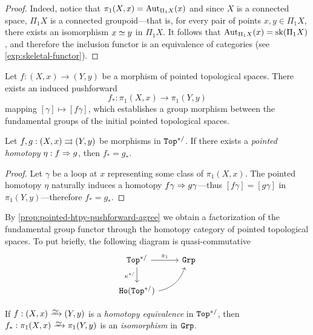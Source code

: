 \begin{proof}
    Indeed, notice that \(\pi_1(X, x) = \operatorname{Aut}_{\Pi_1 X}(x)\) and since \(X\) is a
    connected space, \(\Pi_1 X\) is a connected groupoid---that is, for every pair
    of points \(x, y \in \Pi_1 X\), there exists an isomorphism \(x \simeq y\) in
    \(\Pi_1 X\). It follows that \(\operatorname{Aut}_{\Pi_1 X} (x) = \operatorname{sk} (\Pi_1 X)\), and
    therefore the inclusion functor is an equivalence of categories (see
    \cref{exp:skeletal-functor}).
\end{proof}

\begin{definition}[Pushforwards in \(\pi_1\)]
    \label{def:pushforward-pi1}
    Let \(f: (X, x) \to (Y, y)\) be a morphism of pointed topological spaces. There
    exists an induced pushforward
    \[
        f_{*}: \pi_1(X, x) \longrightarrow \pi_1(Y, y)
    \]
    mapping \([\gamma] \mapsto [f \gamma]\), which establishes a group morphism
    between the fundamental groups of the initial pointed topological spaces.
\end{definition}

\begin{proposition}
    \label{prop:pointed-htpy-pushforward-agree}
    Let \(f, g: (X, x) \rightrightarrows (Y, y)\) be morphisms in \({\texttt{Top}^{*/}}\). If there exists a
    \emph{pointed homotopy} \(\eta: f \Rightarrow g\), then \(f_{*} = g_{*}\).
\end{proposition}

\begin{proof}
    Let \(\gamma\) be a loop at \(x\) representing some class of \(\pi_1(X,
    x)\). The pointed homotopy \(\eta\) naturally induces a homotopy
    \(f \gamma \Rightarrow g \gamma\)---thus \([f \gamma] = [g \gamma]\) in
    \(\pi_1(Y, y)\)---therefore \(f_{*} = g_{*}\).
\end{proof}

By \cref{prop:pointed-htpy-pushforward-agree} we obtain a factorization of the
fundamental group functor through the homotopy category of pointed topological
spaces. To put briefly, the following diagram is quasi-commutative
\[
    \begin{tikzcd}
        \bpTop \ar[r, "\pi_1"] \ar[d, "\kappa^{*/}"'] &\Grp \\
        \Ho{\bpTop} \ar[ru, bend right]
    \end{tikzcd}
\]

\begin{corollary}
    \label{cor:pushforward-preserve-isomorphism}
    If \(f: (X, x) \isoto (Y, y)\) is a \emph{homotopy equivalence} in \({\texttt{Top}^{*/}}\),
    then \(f_{*}: \pi_1(X, x) \isoto \pi_1(Y, y)\) is an \emph{isomorphism} in
    \({\texttt{Grp}}\).
\end{corollary}

